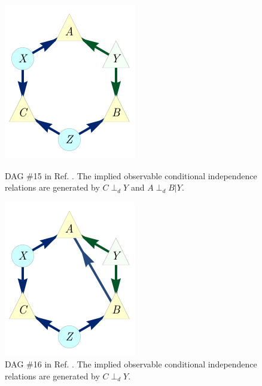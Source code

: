 \documentclass[aps,english,10pt,superscriptaddress,onecolumn,twoside,longbibliography,pra,floatfix,fleqn,nofootinbib]{revtex4-1}%
\theoremstyle{definition}
\newcommand{\aindep}{\ensuremath{\perp_d}} %
\begin{document}
\begin{figure}[t]
\centering
\begin{minipage}[t]{0.3\linewidth}
\centering
\includegraphics[scale=1]{scen15DAG.pdf}
\caption{DAG \#15 in Ref. \cite{pusey2014gdag}. The implied observable conditional independence relations are generated by $C\aindep Y$ and $A \aindep B|Y$.}\label{fig:GDAG15morecircular}
\end{minipage}
\hfill
\begin{minipage}[t]{0.3\linewidth}
\centering
\includegraphics[scale=1]{scen16DAG.pdf}
\caption{DAG \#16 in Ref. \cite{pusey2014gdag}. The implied observable conditional independence relations are generated by $C\aindep Y$.}\label{fig:GDAG16}
\end{minipage}
\hfill
\begin{minipage}[t]{0.3\linewidth}

\end{minipage}
\end{figure}
\end{document}
